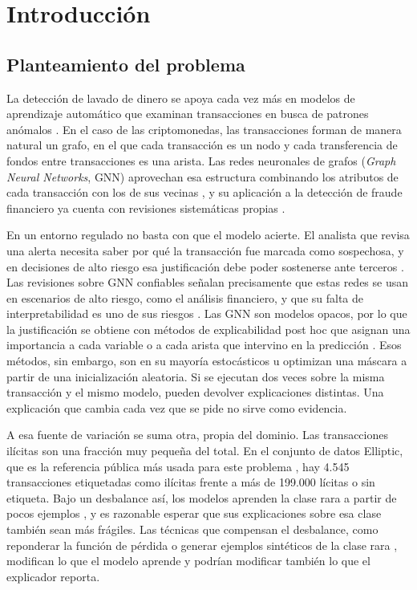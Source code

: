 \chapter{Introducción}\label{cap:introduccion}

\section{Planteamiento del problema}

La detección de lavado de dinero se apoya cada vez más en modelos de aprendizaje automático
que examinan transacciones en busca de patrones anómalos \cite{Chen2018AMLReview,
Kute2021AMLReview}. En el caso de las criptomonedas, las transacciones forman de manera natural
un grafo, en el que cada transacción es un nodo y cada transferencia de fondos entre
transacciones es una arista. Las redes neuronales de grafos (\textit{Graph Neural Networks},
GNN) aprovechan esa estructura combinando los atributos de cada transacción con los de sus
vecinas \cite{Scarselli2009GNN, Wu2021Survey}, y su aplicación a la detección de fraude financiero ya cuenta con revisiones sistemáticas propias \cite{Motie2024FraudGNN}.

En un entorno regulado no basta con que el modelo acierte. El analista que revisa una alerta necesita saber por qué la transacción fue marcada como sospechosa, y en decisiones de alto riesgo esa justificación debe poder sostenerse ante terceros \cite{Rudin2019Stop, Arrieta2020XAI}. Las revisiones sobre GNN confiables señalan precisamente que estas redes se usan en escenarios de alto riesgo, como el análisis financiero, y que su falta de interpretabilidad es uno de sus riesgos \cite{Dai2024Trustworthy}. Las GNN son modelos
opacos, por lo que la justificación se obtiene con métodos de explicabilidad
post hoc que asignan una importancia a cada variable o a cada arista que intervino en la
predicción \cite{Yuan2023Taxonomic}. Esos métodos, sin embargo, son en su mayoría
estocásticos u optimizan una máscara a partir de una inicialización aleatoria. Si se ejecutan
dos veces sobre la misma transacción y el mismo modelo, pueden devolver explicaciones
distintas. Una explicación que cambia cada vez que se pide no sirve como evidencia.

A esa fuente de variación se suma otra, propia del dominio. Las transacciones ilícitas son
una fracción muy pequeña del total. En el conjunto de datos Elliptic, que es la referencia
pública más usada para este problema \cite{Weber2019Elliptic}, hay 4.545 transacciones
etiquetadas como ilícitas frente a más de 199.000 lícitas o sin etiqueta. Bajo un desbalance
así, los modelos aprenden la clase rara a partir de pocos ejemplos \cite{He2009Imbalanced,
Johnson2019Survey}, y es razonable esperar que sus explicaciones sobre esa clase también sean
más frágiles. Las técnicas que compensan el desbalance, como reponderar la función de
pérdida o generar ejemplos sintéticos de la clase rara \cite{Chawla2002SMOTE, Lin2020Focal},
modifican lo que el modelo aprende y podrían modificar también lo que el explicador reporta.

